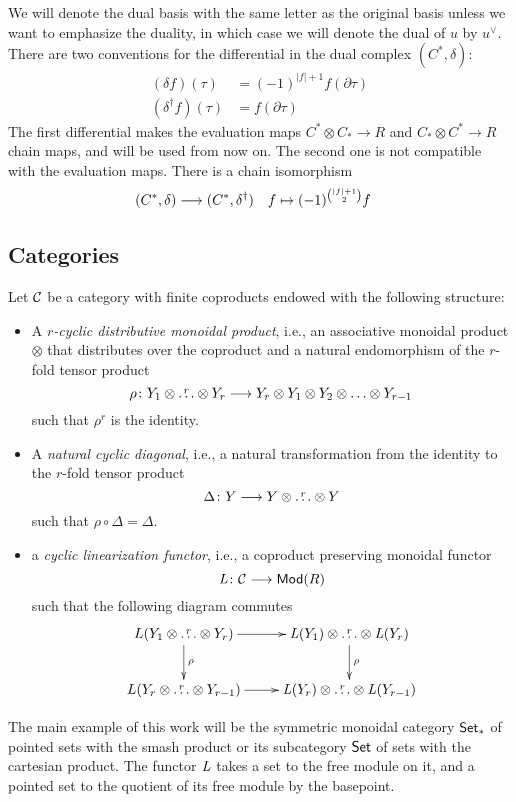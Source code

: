 We will denote the dual basis with the same letter as the original basis unless we want to emphasize the duality, in which case we will denote the dual of $u$ by $u^\vee$. There are two conventions for the differential in the dual complex $(C^*,\delta)$:
\begin{align*}
    (\delta f)(\tau) &= (-1)^{|f|+1} f(\partial \tau) \\
    (\delta^\dagger f)(\tau) &= f(\partial \tau)
\end{align*}
The first differential makes the evaluation maps $C^*\otimes C_*\to R$ and $C_*\otimes C^*\to R$ chain maps, and will be used from now on. The second one is not compatible with the evaluation maps. There is a chain isomorphism
\begin{align*}
    (C^*,\delta) &\longrightarrow (C^*,\delta^\dagger) & f&\mapsto (-1)^{\binom{|f|+1}{2}} f
\end{align*}

\subsection{Categories} Let $\mathcal{C}$ be a category with finite coproducts endowed with the following structure:
\begin{itemize}
    \item A \emph{$r$-cyclic distributive monoidal product}, i.e., an associative monoidal product $\otimes$ that distributes over the coproduct and a natural endomorphism of the $r$-fold tensor product
\[
    \rho\colon Y_1\otimes  \overset{r}{\ldots}\otimes Y_r\longrightarrow Y_r\otimes Y_1\otimes Y_2\otimes \ldots \otimes Y_{r-1}    
\]
such that $\rho^r$ is the identity.
    \item A \emph{natural cyclic diagonal}, i.e., a natural transformation from the identity to the $r$-fold tensor product
\[
    \Delta\colon Y\longrightarrow Y\otimes \overset{r}{\ldots}\otimes Y 
\]
such that $\rho\circ \Delta = \Delta$.
    \item a \emph{cyclic linearization functor}, i.e., a coproduct preserving monoidal functor 
\[
    \operatorname{{\it L}}\colon \mathcal{C}\longrightarrow \mathsf{Mod}(R)
\]
    such that the following diagram commutes 
\[
\xymatrix{
    L(Y_1\otimes \overset{r}{\ldots} \otimes Y_r)  \ar[r]\ar[d]^{\rho} & \abel(Y_1)\otimes \overset{r}{\ldots} \otimes \abel(Y_r)\ar[d]^{\rho} \\
    L(Y_{r}\otimes \overset{r}{\ldots} \otimes Y_{r-1})  \ar[r] & \abel(Y_r)\otimes \overset{r}{\ldots} \otimes \abel(Y_{r-1}) }
\]
\end{itemize}
The main example of this work will be the symmetric monoidal category $\mathsf{Set}_*$ of pointed sets with the smash product or its subcategory $\mathsf{Set}$ of sets with the cartesian product. The functor $\operatorname{{\it L}}$ takes a set to the free module on it, and a pointed set to the quotient of its free module by the basepoint. 



